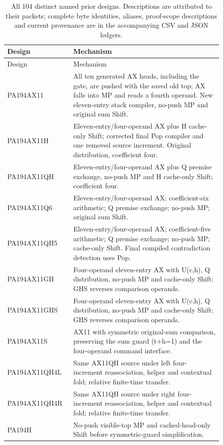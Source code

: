 \begingroup
\small
\setlength{\tabcolsep}{3pt}
\begin{longtable}{p{0.24\linewidth}p{0.64\linewidth}}
\caption{All 104 distinct named prior designs. Descriptions are attributed to their packets; complete byte identities, aliases, proof-scope descriptions and current provenance are in the accompanying CSV and JSON ledgers.}\\
\toprule Design & Mechanism\\\midrule\endfirsthead
\toprule Design & Mechanism\\\midrule\endhead
\bottomrule\endfoot
PA194AX11 & All ten generated AX heads, including the gate, are pushed with the saved old top; AX falls into MP and reads a fourth operand. New eleven-entry stack compiler, no-push MP and original sum Shift.\\[4pt]
PA194AX11H & Eleven-entry/four-operand AX plus H cache-only Shift; corrected final Pop compiler and one removed source increment. Original distribution, coefficient four.\\[4pt]
PA194AX11QH & Eleven-entry/four-operand AX plus Q premise exchange, no-push MP and H cache-only Shift; coefficient four.\\[4pt]
PA194AX11Q6 & Eleven-entry/four-operand AX; coefficient-six arithmetic; Q premise exchange; no-push MP; original sum Shift.\\[4pt]
PA194AX11QH5 & Eleven-entry/four-operand AX; coefficient-five arithmetic; Q premise exchange; no-push MP; cache-only Shift. Final compiled contradiction detection uses Pop.\\[4pt]
PA194AX11GH & Four-operand eleven-entry AX with U(c,h), Q distribution, no-push MP and cache-only Shift; GHS reverses comparison operands.\\[4pt]
PA194AX11GHS & Four-operand eleven-entry AX with U(c,h), Q distribution, no-push MP and cache-only Shift; GHS reverses comparison operands.\\[4pt]
PA194AX11S & AX11 with symmetric original-sum comparison, preserving the sum guard (t+h=1) and the four-operand command interface.\\[4pt]
PA194AX11QH4L & Same AX11QH source under left four-increment reassociation, helper and contextual fold; relative finite-time transfer.\\[4pt]
PA194AX11QH4R & Same AX11QH source under right four-increment reassociation, helper and contextual fold; relative finite-time transfer.\\[4pt]
PA194H & No-push visible-top MP and cached-head-only Shift before symmetric-guard simplification.\\[4pt]

\end{longtable}
